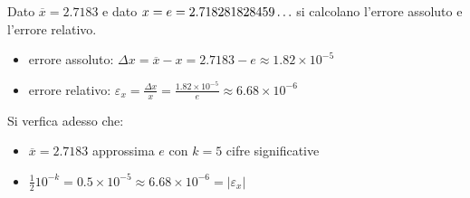 \begin{center}
\footnotesize\noindent{}\end{center}

\noindent Dato \(\overline{x} = 2.7183\) e dato \(x = e = 2.718281828459\ldots \space \) si calcolano l'errore assoluto e l'errore relativo.

\begin{itemize}
	\item errore assoluto: \(\Delta x = \overline{x} - x = 2.7183 - e \approx 1.82 \times 10^{-5}\)
	\item errore relativo: \(\varepsilon_x = \frac{\Delta x}{x} = \frac{ 1.82 \times 10^{-5}}{e} \approx 6.68 \times 10^{-6}\)
\end{itemize}

\noindent Si verfica adesso che:

\begin{itemize}
	\item \(\overline{x} = 2.7183\) approssima \(e\) con \(k=5\) cifre significative
	\item \( \frac{1}{2}10^{-k} = 0.5 \times 10^{-5} \approx 6.68 \times 10^{-6} = |\varepsilon_x|\)
\end{itemize}
